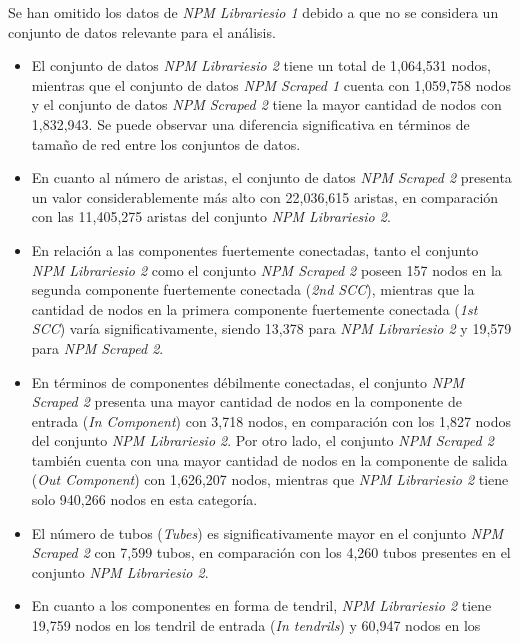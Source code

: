 Se han omitido los datos de \textit{NPM Librariesio 1} debido a que no se considera un conjunto
de datos relevante para el análisis.

\begin{itemize}
    \item El conjunto de datos \textit{NPM Librariesio 2} tiene un total de 1,064,531 nodos,
          mientras que el conjunto de datos \textit{NPM Scraped 1} cuenta con 1,059,758 nodos y el
          conjunto de datos \textit{NPM Scraped 2} tiene la mayor cantidad de nodos con 1,832,943.
          Se puede observar una diferencia significativa en términos de tamaño de red entre los
          conjuntos de datos.
    \item En cuanto al número de aristas, el conjunto de datos \textit{NPM Scraped 2} presenta
          un valor considerablemente más alto con 22,036,615 aristas, en comparación con las
          11,405,275 aristas del conjunto \textit{NPM Librariesio 2}.
    \item En relación a las componentes fuertemente conectadas, tanto el conjunto
          \textit{NPM Librariesio 2} como el conjunto \textit{NPM Scraped 2} poseen 157 nodos en
          la segunda componente fuertemente conectada (\textit{2nd SCC}), mientras que la cantidad
          de nodos en la primera componente fuertemente conectada (\textit{1st SCC}) varía
          significativamente, siendo 13,378 para \textit{NPM Librariesio 2} y 19,579 para
          \textit{NPM Scraped 2}.
    \item En términos de componentes débilmente conectadas, el conjunto \textit{NPM Scraped 2}
          presenta una mayor cantidad de nodos en la componente de entrada (\textit{In Component})
          con 3,718 nodos, en comparación con los 1,827 nodos del conjunto \textit{NPM Librariesio 2}.
          Por otro lado, el conjunto \textit{NPM Scraped 2} también cuenta con una mayor cantidad de
          nodos en la componente de salida (\textit{Out Component}) con 1,626,207 nodos, mientras
          que \textit{NPM Librariesio 2} tiene solo 940,266 nodos en esta categoría.
    \item El número de tubos (\textit{Tubes}) es significativamente mayor en el conjunto
          \textit{NPM Scraped 2} con 7,599 tubos, en comparación con los 4,260 tubos presentes en
          el conjunto \textit{NPM Librariesio 2}.
    \item En cuanto a los componentes en forma de tendril, \textit{NPM Librariesio 2} tiene
          19,759 nodos en los tendril de entrada (\textit{In tendrils}) y 60,947 nodos en los

\end{itemize}

